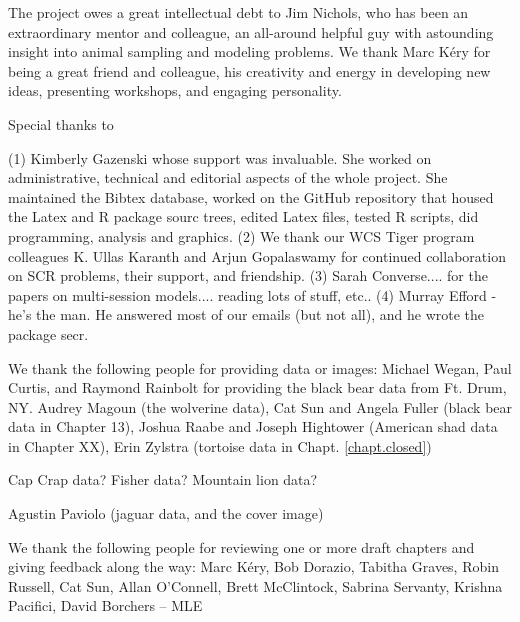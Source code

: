 
The project owes a great intellectual debt to Jim Nichols, who has
been an extraordinary mentor and colleague, an all-around helpful guy with
astounding insight into animal sampling and modeling problems. 
We thank Marc K\'{e}ry for being a great friend and colleague, his
creativity and 
energy in developing new ideas, presenting workshops, and engaging
personality. 

Special thanks to

(1) Kimberly Gazenski whose support was invaluable. She worked on 
administrative, technical and
editorial aspects of the whole project. She
maintained the Bibtex database, 
worked on the GitHub repository that housed the Latex and R package
sourc trees, edited Latex files, tested R scripts, did programming,
analysis and graphics. 
(2) We thank our WCS Tiger program colleagues K. Ullas Karanth and Arjun
Gopalaswamy for continued collaboration on SCR problems, their
support, and friendship.
(3) 
Sarah Converse.... for the papers on multi-session models.... reading
lots of stuff, etc..
(4)
Murray Efford - he's the man. He answered most of our emails (but not
all), and he wrote the package secr.


We thank the following people for providing data or images:
Michael Wegan, Paul Curtis, and Raymond Rainbolt for providing the black bear data from Ft. Drum, NY. 
Audrey Magoun (the wolverine data), 
Cat Sun and Angela Fuller (black bear data in Chapter 13),
Joshua Raabe and Joseph Hightower (American shad data in Chapter XX),
Erin Zylstra (tortoise data in Chapt. \ref{chapt.closed})

Cap Crap data? Fisher data?  Mountain lion data?

Agustin Paviolo (jaguar data, and the cover image)

We thank the following people for reviewing one or more draft chapters
and giving feedback along the way:
Marc K\'{e}ry, 
Bob Dorazio,
Tabitha Graves,
Robin Russell,
Cat Sun,
Allan O'Connell,
Brett McClintock,
Sabrina Servanty,
Krishna Pacifici,
David Borchers -- MLE
